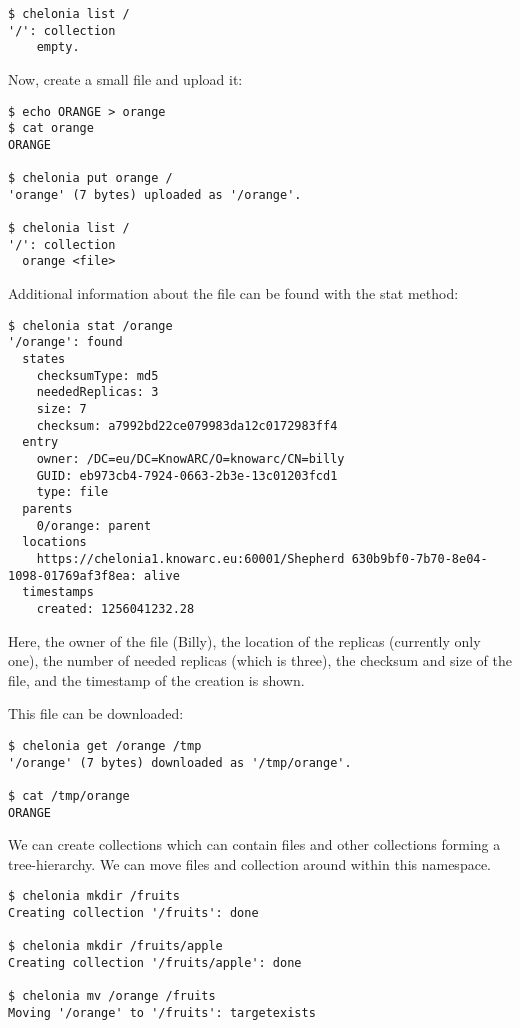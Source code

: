 \documentclass{article}
\begin{document}
\begin{verbatim}
$ chelonia list /
'/': collection
    empty.
\end{verbatim}

Now, create a small file and upload it:

\begin{verbatim}
$ echo ORANGE > orange
$ cat orange 
ORANGE

$ chelonia put orange /
'orange' (7 bytes) uploaded as '/orange'.

$ chelonia list /
'/': collection
  orange <file>
\end{verbatim}

Additional information about the file can be found with the stat method:

\begin{verbatim}
$ chelonia stat /orange
'/orange': found
  states
    checksumType: md5
    neededReplicas: 3
    size: 7
    checksum: a7992bd22ce079983da12c0172983ff4
  entry
    owner: /DC=eu/DC=KnowARC/O=knowarc/CN=billy
    GUID: eb973cb4-7924-0663-2b3e-13c01203fcd1
    type: file
  parents
    0/orange: parent
  locations
    https://chelonia1.knowarc.eu:60001/Shepherd 630b9bf0-7b70-8e04-1098-01769af3f8ea: alive
  timestamps
    created: 1256041232.28
\end{verbatim}

Here, the owner of the file (Billy), the location of the replicas (currently only one), the number of needed replicas (which is three), the checksum and size of the file, and the timestamp of the creation is shown.

This file can be downloaded:

\begin{verbatim}
$ chelonia get /orange /tmp
'/orange' (7 bytes) downloaded as '/tmp/orange'.

$ cat /tmp/orange 
ORANGE
\end{verbatim}

We can create collections which can contain files and other collections forming a tree-hierarchy. We can move files and collection around within this namespace.

\begin{verbatim}
$ chelonia mkdir /fruits
Creating collection '/fruits': done

$ chelonia mkdir /fruits/apple
Creating collection '/fruits/apple': done

$ chelonia mv /orange /fruits
Moving '/orange' to '/fruits': targetexists
\end{verbatim}
\end{document}
